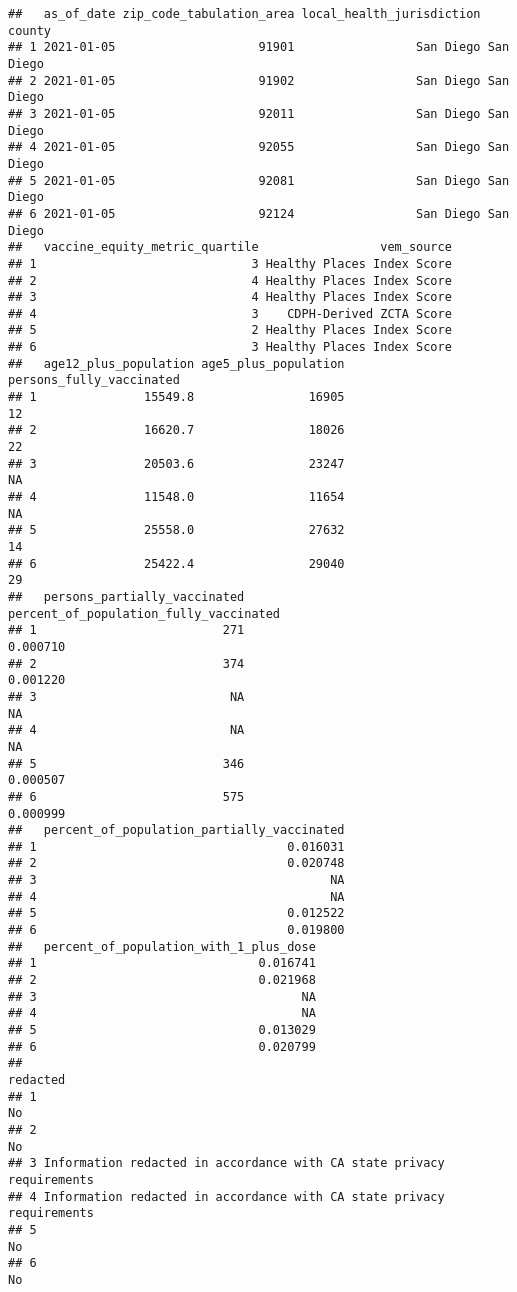 \documentclass[
]{article}
\begin{document}
\begin{verbatim}
##   as_of_date zip_code_tabulation_area local_health_jurisdiction    county
## 1 2021-01-05                    91901                 San Diego San Diego
## 2 2021-01-05                    91902                 San Diego San Diego
## 3 2021-01-05                    92011                 San Diego San Diego
## 4 2021-01-05                    92055                 San Diego San Diego
## 5 2021-01-05                    92081                 San Diego San Diego
## 6 2021-01-05                    92124                 San Diego San Diego
##   vaccine_equity_metric_quartile                 vem_source
## 1                              3 Healthy Places Index Score
## 2                              4 Healthy Places Index Score
## 3                              4 Healthy Places Index Score
## 4                              3    CDPH-Derived ZCTA Score
## 5                              2 Healthy Places Index Score
## 6                              3 Healthy Places Index Score
##   age12_plus_population age5_plus_population persons_fully_vaccinated
## 1               15549.8                16905                       12
## 2               16620.7                18026                       22
## 3               20503.6                23247                       NA
## 4               11548.0                11654                       NA
## 5               25558.0                27632                       14
## 6               25422.4                29040                       29
##   persons_partially_vaccinated percent_of_population_fully_vaccinated
## 1                          271                               0.000710
## 2                          374                               0.001220
## 3                           NA                                     NA
## 4                           NA                                     NA
## 5                          346                               0.000507
## 6                          575                               0.000999
##   percent_of_population_partially_vaccinated
## 1                                   0.016031
## 2                                   0.020748
## 3                                         NA
## 4                                         NA
## 5                                   0.012522
## 6                                   0.019800
##   percent_of_population_with_1_plus_dose
## 1                               0.016741
## 2                               0.021968
## 3                                     NA
## 4                                     NA
## 5                               0.013029
## 6                               0.020799
##                                                                redacted
## 1                                                                    No
## 2                                                                    No
## 3 Information redacted in accordance with CA state privacy requirements
## 4 Information redacted in accordance with CA state privacy requirements
## 5                                                                    No
## 6                                                                    No
\end{verbatim}
\end{document}
